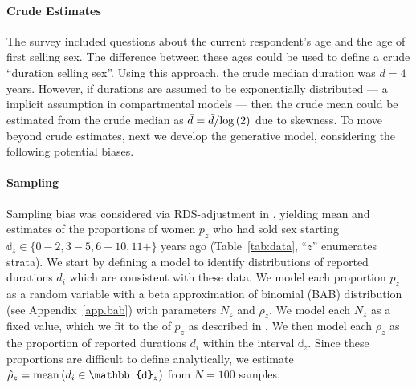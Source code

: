 \paragraph{Crude Estimates}
The survey \cite{Baral2014} included questions about
the current respondent's age and the age of first selling sex.
The difference between these ages could be used to define a crude ``duration selling sex''.
Using this approach, the crude median duration was $\tilde{d} = 4$ years.
However, if durations are assumed to be exponentially distributed
--- a implicit assumption in compartmental models \cite{Anderson1991} ---
then the crude mean could be estimated from the crude median as
$\bar{d} = \tilde{d}/\mathrm{log}\,(2)$ due to skewness.  %
To move beyond crude estimates, next we develop the generative model, %
considering the following potential biases.
\paragraph{Sampling}
Sampling bias was considered via RDS-adjustment in \cite{Baral2014},
yielding mean and \ci estimates of the proportions of women $p_z$
who had sold sex starting $\mathbb{d}_z \in \{0{-}2, 3{-}5, 6{-}10, 11+\}$ years ago
(Table~\ref{tab:data}, ``$z$'' enumerates strata).
We start by defining a model to identify distributions of reported durations $d_i$
which are consistent with these data.
We model each proportion $p_z$ as a random variable with
a beta approximation of binomial (BAB) distribution (see Appendix~\ref{app.bab}) %
with parameters $N_z$ and $\rho_z$.
We model each $N_z$ as a fixed value,
which we fit to the \ci of $p_z$ as described in .
We then model each $\rho_z$ as
the proportion of reported durations $d_i$ within the interval $\mathbb{d}_z$.
Since these proportions are difficult to define analytically,
we estimate $\hat{\rho}_z = \distr{mean}{d_i \in \mathbb{d}_z}$ from $N = 100$ samples.
